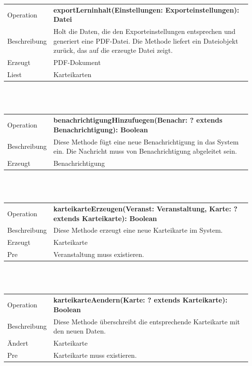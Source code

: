 \documentclass[12pt,a4paper]{article}
\begin{document}
{\begin{tabular}{|l|p{12cm}|}
	\hline
	Operation &  \textbf{exportLerninhalt(Einstellungen: Exporteinstellungen): Datei} \\ 
	Beschreibung & Holt die Daten, die den Exporteinstellungen entsprechen und generiert eine PDF-Datei. Die Methode liefert ein Dateiobjekt zurück, das auf die erzeugte Datei zeigt. \\ 
	Erzeugt & PDF-Dokument \\ 
	Liest &  Karteikarten \\ 
	\hline 
\end{tabular} \\\\

\begin{tabular}{|l|p{12cm}|}
	\hline
	Operation & \textbf{ benachrichtigungHinzufuegen(Benachr: ? extends Benachrichtigung): Boolean }\\ 
	Beschreibung & Diese Methode fügt eine neue Benachrichtigung in das System ein. Die Nachricht muss von Benachrichtigung abgeleitet sein.\\ 
	Erzeugt & Benachrichtigung \\ 
	\hline 
\end{tabular} \\\\

\begin{tabular}{|l|p{12cm}|}
	\hline
	Operation &  \textbf{karteikarteErzeugen(Veranst: Veranstaltung, Karte: ? extends Karteikarte): Boolean} \\ 
	Beschreibung & Diese Methode erzeugt eine neue Karteikarte im System.\\ 
	Erzeugt & Karteikarte \\ 
	Pre & Veranstaltung muss existieren. \\ 
	\hline 
\end{tabular} \\\\

\begin{tabular}{|l|p{12cm}|}
	\hline
	Operation & \textbf{ karteikarteAendern(Karte: ? extends Karteikarte): Boolean} \\ 
	Beschreibung & Diese Methode überschreibt die entsprechende Karteikarte mit den neuen Daten.\\ 
	Ändert & Karteikarte \\ 
	Pre & Karteikarte muss existieren. \\ 
	\hline 
\end{tabular} \\\\

}
\end{document}
